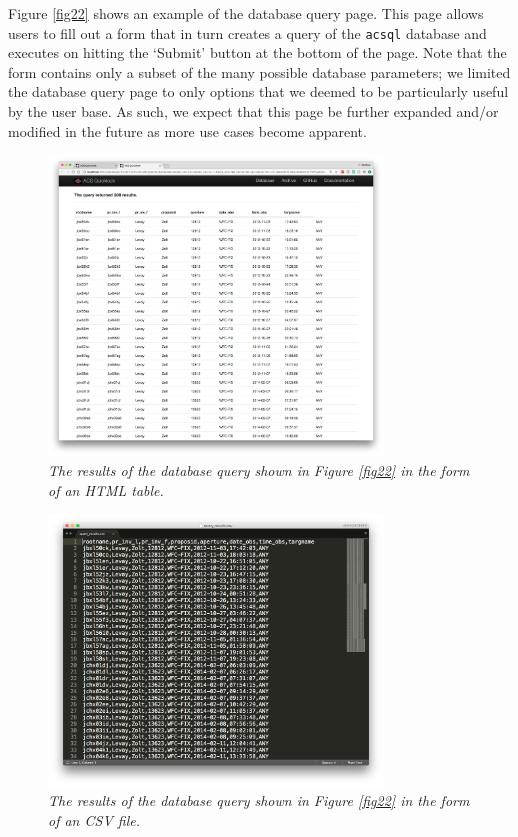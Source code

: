 \documentclass[10pt,journal,compsoc]{IEEEtran}
\begin{document}
Figure \ref{fig22} shows an example of the database query page.  This page allows users to fill out a form that in turn creates a query of the \texttt{acsql} database and executes
on hitting the `Submit' button at the bottom of the page.  Note that the form contains only a subset of the many possible database parameters; we limited the database query page to only
options that we deemed to be particularly useful by the user base.  As such, we expect that this page be further expanded and/or modified in the future as more use cases become apparent.

\begin{figure}[!h]
\centering
\includegraphics[width=3.5in]{./figures/database_query_results_html.png}
\caption{\textit{The results of the database query shown in Figure \ref{fig22} in the form of an HTML table.}}
\label{fig23}
\end{figure}

\begin{figure}[!h]
\centering
\includegraphics[width=3.5in]{./figures/database_query_results_csv.png}
\caption{\textit{The results of the database query shown in Figure \ref{fig22} in the form of an CSV file.}}
\label{fig24}
\end{figure}
\end{document}
